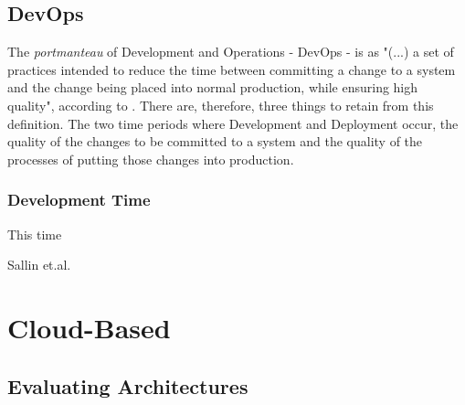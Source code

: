 \subsection{DevOps}\label{state-of-the-art:ss:devops}

The \textit{portmanteau} of Development and Operations - DevOps - is as "(...) a set of practices intended to reduce the time between committing a change to a system and the change being placed into normal production, while ensuring high quality", according to \parencite{bass_weber_zhu_2015}. There are, therefore, three things to retain from this definition. The two time periods where Development and Deployment occur, the quality of the changes to be committed to a system and the quality of the processes of putting those changes into production.

\subsubsection{Development Time}
This time






Sallin et.al. \parencite{sallin_kropp_anslow_quilty_meier_2021}

\section{Cloud-Based}\label{state-of-the-art:s:cloud-based}

\subsection{Evaluating Architectures}\label{state-of-the-art:ss:evaluating-architectures}

